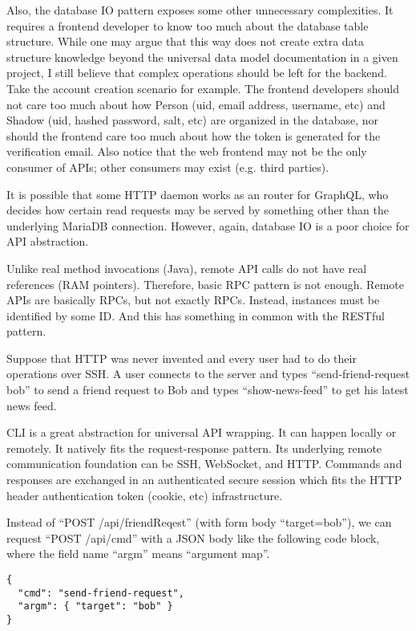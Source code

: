 \begin{multicols*}{2}
	Also, the database IO pattern exposes some other unnecessary complexities.
	It requires a frontend developer to know too much about the database table structure.
	While one may argue that this way does not create extra data structure knowledge beyond
	the universal data model documentation in a given project,
	I still believe that complex operations should be left for the backend.
	Take the account creation scenario for example.
	The frontend developers should not care too much about how Person (uid, email address, username, etc)
	and Shadow (uid, hashed password, salt, etc) are organized in the database,
	nor should the frontend care too much about how the token is generated for the verification email.
	Also notice that the web frontend may not be the only consumer of APIs; other consumers may exist (e.g. third parties).

	It is possible that some HTTP daemon works as an router for GraphQL,
	who decides how certain read requests may be served by something other than the underlying MariaDB connection.
	However, again, database IO is a poor choice for API abstraction.

    Unlike real method invocations (Java), remote API calls do not have real references (RAM pointers).
    Therefore, basic RPC pattern is not enough.
    Remote APIs are basically RPCs, but not exactly RPCs.
    Instead, instances must be identified by some ID.
    And this has something in common with the RESTful pattern.
    
	Suppose that HTTP was never invented and every user had to do their operations over SSH.
	A user connects to the server and types ``send-friend-request bob'' to send a friend request to Bob
	and types ``show-news-feed'' to get his latest news feed.

	CLI is a great abstraction for universal API wrapping.
	It can happen locally or remotely.
    It natively fits the request-response pattern.
    Its underlying remote communication foundation can be SSH, WebSocket, and HTTP.
    Commands and responses are exchanged in an authenticated secure session
    which fits the HTTP header authentication token (cookie, etc) infrastructure.

	Instead of ``POST /api/friendReqest'' (with form body ``target=bob''), we can request ``POST /api/cmd''
	with a JSON body like the following code block,
    where the field name ``argm'' means ``argument map''.

\lstset{linewidth=\linewidth}
\begin{lstlisting}
{
  "cmd": "send-friend-request",
  "argm": { "target": "bob" }
}
\end{lstlisting}


\end{multicols*}
